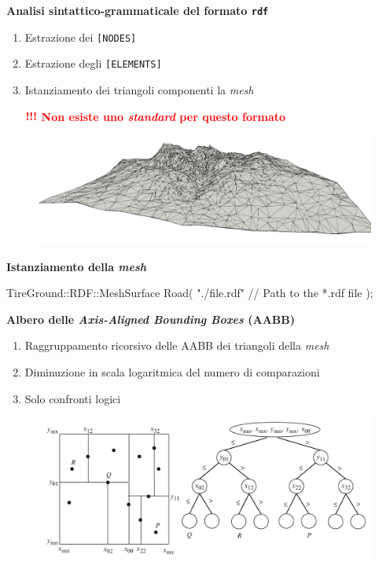 \documentclass[xcolor=dvipsnames]{beamer} %
\begin{document}
\begin{frame}[fragile]
	\Large{\textbf{Analisi sintattico-grammaticale del formato \texttt{rdf}}}
	\normalsize
	\begin{enumerate}
		\item Estrazione dei \texttt{[NODES]}
		\item Estrazione degli \texttt{[ELEMENTS]}
		\item Istanziamento dei triangoli componenti la \textit{mesh}
		\item[$\textcolor{red}{\textbf{!!!}}$] \textcolor{red}{\textbf{Non esiste uno \textit{standard} per questo formato}}
	\end{enumerate}
\vspace{-0.3cm}
\begin{figure}
	\centering
	\includegraphics[width=0.7\linewidth]{../Figures/mesh}
\end{figure}
\vspace{-0.6cm}
\Large{\textbf{Istanziamento della \textit{mesh}}}
\begin{pseudoc}
TireGround::RDF::MeshSurface Road(
"./file.rdf" // Path to the *.rdf file
);
\end{pseudoc}
\end{frame}

\begin{frame}
	\Large{\textbf{Albero delle \textit{Axis-Aligned Bounding Boxes} (AABB)}}
	\normalsize
	\begin{enumerate}
		\item Raggruppamento ricorsivo delle AABB dei triangoli della \textit{mesh}
		\item Diminuzione in scala logaritmica del numero di comparazioni
		\item Solo confronti logici
	\end{enumerate}
	\begin{figure}
		\centering
		\includegraphics[width=0.85\linewidth]{../Figures/AABB}
	\end{figure}
\end{frame}
\end{document}
